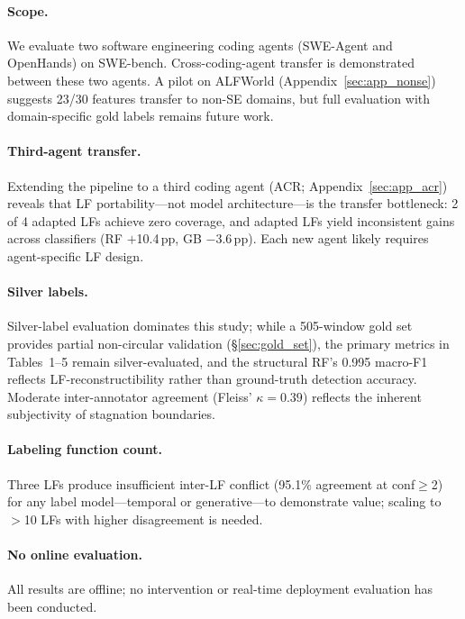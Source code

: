 \label{sec:limitations}

\paragraph{Scope.}
We evaluate two software engineering coding agents (SWE-Agent and OpenHands) on SWE-bench.
Cross-coding-agent transfer is demonstrated between these two agents.
A pilot on ALFWorld (Appendix~\ref{sec:app_nonse}) suggests 23/30 features transfer to non-SE domains, but full evaluation with domain-specific gold labels remains future work.

\paragraph{Third-agent transfer.}
Extending the pipeline to a third coding agent (ACR; Appendix~\ref{sec:app_acr}) reveals that LF portability---not model architecture---is the transfer bottleneck: 2 of 4 adapted LFs achieve zero coverage, and adapted LFs yield inconsistent gains across classifiers (RF $+$10.4\,pp, GB $-$3.6\,pp).
Each new agent likely requires agent-specific LF design.

\paragraph{Silver labels.}
Silver-label evaluation dominates this study; while a 505-window gold set provides partial non-circular validation (\S\ref{sec:gold_set}), the primary metrics in Tables~1--5 remain silver-evaluated, and the structural RF's 0.995 macro-F1 reflects LF-reconstructibility rather than ground-truth detection accuracy.
Moderate inter-annotator agreement (Fleiss' $\kappa{=}0.39$) reflects the inherent subjectivity of stagnation boundaries.

\paragraph{Labeling function count.}
Three LFs produce insufficient inter-LF conflict (95.1\% agreement at conf${\geq}$2) for any label model---temporal or generative---to demonstrate value; scaling to ${>}$10 LFs with higher disagreement is needed.

\paragraph{No online evaluation.}
All results are offline; no intervention or real-time deployment evaluation has been conducted.

